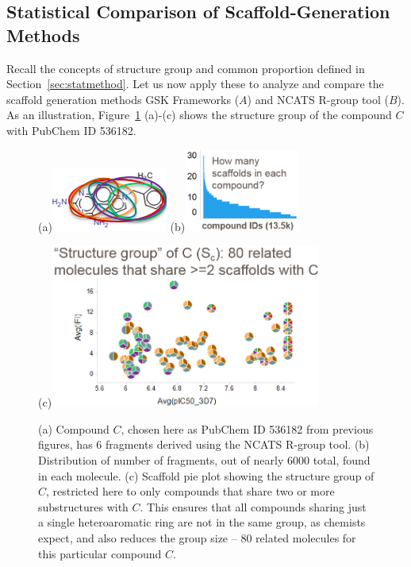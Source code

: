 \documentclass[journal=jacsat,manuscript=article]{achemso}
\newcommand*\fref[1]{Figure~\ref{fig:#1}}
\newcommand*\sref[1]{Section~\ref{sec:#1}}
\begin{document}
\subsection{Statistical Comparison of Scaffold-Generation Methods}\label{sec:statcomp}

Recall the concepts of structure group and common proportion defined in \sref{statmethod}.  Let us now apply these to analyze and compare the scaffold generation methods GSK Frameworks ($A$) and NCATS R-group tool ($B$). As an illustration, \fref{strucgroup} (a)-(c) shows the structure group of the compound $C$ with PubChem ID 536182. 
\begin{figure}
\centering
  \begin{minipage}[b][0.2\textheight][s]{0.3\textwidth}
  \centering
  (a)\includegraphics[width=1.5in]{fig/mol_6scaf.png}
  (b)\includegraphics[width=1.5in]{fig/howmany_scaf.png}
  \end{minipage}
  (c)\includegraphics[width=3.5in]{fig/structure_group_C.png}
  \caption{(a) Compound $C$, chosen here as PubChem ID 536182 from previous figures, has 6 fragments derived using the NCATS R-group tool. (b) Distribution of number of fragments, out of nearly 6000 total, found in each molecule. (c) Scaffold pie plot showing the structure group of $C$, restricted here to only compounds that share two or more substructures with $C$. This ensures that all compounds sharing just a single heteroaromatic ring are not in the same group, as chemists expect, and also reduces the group size -- 80 related molecules for this particular compound $C$.}
    \label{fig:strucgroup}
\end{figure}
\end{document}
